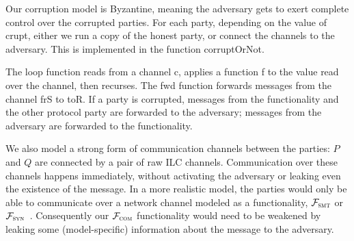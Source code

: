 Our corruption model is Byzantine, meaning the adversary gets to exert complete
control over the corrupted parties.  For each party, depending on the value of
\textsf{crupt}, either we run a copy of the honest party, or connect the
channels to the adversary. This is implemented in the function
\textsf{corruptOrNot}.



The \textsf{loop} function reads from a channel \textsf{c}, applies a function
\textsf{f} to the value read over the channel, then recurses.
The \textsf{fwd} function forwards messages from the channel \textsf{frS} to
\textsf{toR}. If a party is corrupted, messages from the functionality and the
other protocol party are forwarded to the adversary; messages from the adversary
are forwarded to the functionality.

We also model a strong form of communication channels between the parties: $P$
and $Q$ are connected by a pair of raw ILC channels. Communication over these
channels happens immediately, without activating the adversary or leaking even
the existence of the message.  In a more realistic model, the parties would only
be able to communicate over a network channel modeled as a functionality,
$\mathcal{F}_{\textnormal{\ensuremath{{\mathsf {{\textsc{smt}}}}}}}$ or $\mathcal{F}_{\textnormal{\ensuremath{{\mathsf {{\textsc{syn}}}}}}}$~\cite{canetti2001universally}.
Consequently our $\mathcal{F}_{\textnormal{\ensuremath{{\mathsf {{\textsc{com}}}}}}}$ functionality would need to be weakened by
leaking some (model-specific) information about the message to the adversary.

%


